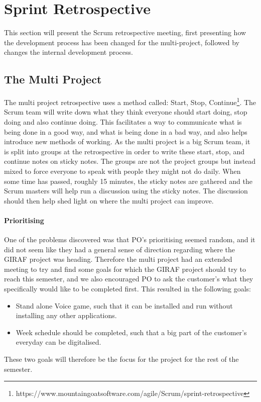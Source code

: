 \section{Sprint Retrospective}\label{s1retro}
This section will present the Scrum retrospective meeting, first presenting how the development process has been changed for the multi-project, followed by changes the internal development process.

\subsection{The Multi Project}\label{retro1}
The multi project retrospective uses a method called: Start, Stop, Continue\footnote{https://www.mountaingoatsoftware.com/agile/Scrum/sprint-retrospective}.
The Scrum team will write down what they think everyone should start doing, stop doing and also continue doing. 
This facilitates a way to communicate what is being done in a good way, and what is being done in a bad way, and also helps introduce new methods of working.
As the multi project is a big Scrum team, it is split into groups at the retrospective in order to write these start, stop, and continue notes on sticky notes.
The groups are not the project groups but instead mixed to force everyone to speak with people they might not do daily.
When some time has passed, roughly 15 minutes, the sticky notes are gathered and the Scrum masters will help run a discussion using the sticky notes.
The discussion should then help shed light on where the multi project can improve.

\paragraph{Prioritising} One of the problems discovered was that PO's prioritising seemed random, and it did not seem like they had a general sense of direction regarding where the GIRAF project was heading.
Therefore the multi project had an extended meeting to try and find some goals for which the GIRAF project should try to reach this semester, and we also encouraged PO to ask the customer's what they specifically would like to be completed first.
This resulted in the following goals:
\begin{itemize}
	\item Stand alone Voice game, such that it can be installed and run without installing any other applications.
	\item Week schedule should be completed, such that a big part of the customer's everyday can be digitalised.
\end{itemize}
These two goals will therefore be the focus for the project for the rest of the semester. 

